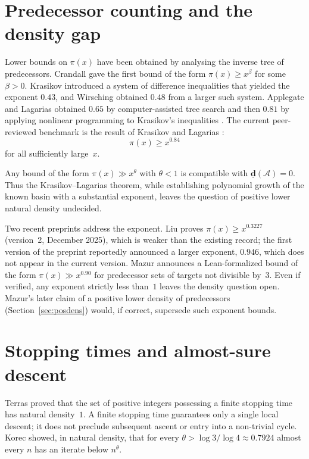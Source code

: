 \documentclass[11pt,reqno,oneside]{amsart}
\begin{document}
\section{Predecessor counting and the density gap}\label{sec:counting}

Lower bounds on $\pi(x)$ have been obtained by analysing the inverse tree of predecessors. Crandall \cite{Crandall78} gave the first bound of the form $\pi(x)\ge x^{\beta}$ for some $\beta>0$. Krasikov \cite{Krasikov89} introduced a system of difference inequalities that yielded the exponent $0.43$, and Wirsching \cite{Wirsching93} obtained $0.48$ from a larger such system. Applegate and Lagarias obtained $0.65$ by computer-assisted tree search \cite{ApplegateLagarias95} and then $0.81$ by applying nonlinear programming to Krasikov's inequalities \cite{ApplegateLagarias95b}. The current peer-reviewed benchmark is the result of Krasikov and Lagarias \cite{KrasikovLagarias03}:
\[
\pi(x)\ge x^{0.84}
\]
for all sufficiently large~$x$.

Any bound of the form $\pi(x)\gg x^\theta$ with $\theta<1$ is compatible with $\underline{\mathbf{d}}(\mathcal{A})=0$. Thus the Krasikov--Lagarias theorem, while establishing polynomial growth of the known basin with a substantial exponent, leaves the question of positive lower natural density undecided.

Two recent preprints address the exponent. Liu \cite{Liu25} proves $\pi(x)\ge x^{0.3227}$ (version~2, December 2025), which is weaker than the existing record; the first version of the preprint reportedly announced a larger exponent, $0.946$, which does not appear in the current version. Mazur \cite{MazurPre090} announces a Lean-formalized bound of the form $\pi(x)\gg x^{0.90}$ for predecessor sets of targets not divisible by~$3$. Even if verified, any exponent strictly less than~$1$ leaves the density question open. Mazur's later claim of a positive lower density of predecessors (Section~\ref{sec:posdens}) would, if correct, supersede such exponent bounds.

\section{Stopping times and almost-sure descent}\label{sec:descent}

Terras \cite{Terras76} proved that the set of positive integers possessing a finite stopping time has natural density~$1$. A finite stopping time guarantees only a single local descent; it does not preclude subsequent ascent or entry into a non-trivial cycle. Korec \cite{Korec94} showed, in natural density, that for every $\theta>\log 3/\log 4\approx 0.7924$ almost every $n$ has an iterate below $n^\theta$.
\end{document}
